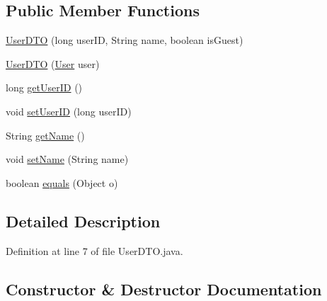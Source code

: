 \subsection*{Public Member Functions}
\begin{DoxyCompactItemize}
\item 
\mbox{\hyperlink{classes_1_1deusto_1_1server_1_1data_1_1_user_d_t_o_a00e605694b6157bcf7a1acc5e2adc735}{User\+D\+TO}} (long user\+ID, String name, boolean is\+Guest)
\item 
\mbox{\hyperlink{classes_1_1deusto_1_1server_1_1data_1_1_user_d_t_o_ab05044a5b24bdbdcc1bbe582b7268b71}{User\+D\+TO}} (\mbox{\hyperlink{classes_1_1deusto_1_1server_1_1jdo_1_1_user}{User}} user)
\item 
long \mbox{\hyperlink{classes_1_1deusto_1_1server_1_1data_1_1_user_d_t_o_ae04b78d874974f7f3307b68fa2a15210}{get\+User\+ID}} ()
\item 
void \mbox{\hyperlink{classes_1_1deusto_1_1server_1_1data_1_1_user_d_t_o_ad96e17b7c2a478f263f7a7b8bf7dde14}{set\+User\+ID}} (long user\+ID)
\item 
String \mbox{\hyperlink{classes_1_1deusto_1_1server_1_1data_1_1_user_d_t_o_a3e5416e48bbbd923f0d23b87f02e3aaf}{get\+Name}} ()
\item 
void \mbox{\hyperlink{classes_1_1deusto_1_1server_1_1data_1_1_user_d_t_o_a15f7773676e2cca068e63f604fb61ab0}{set\+Name}} (String name)
\item 
boolean \mbox{\hyperlink{classes_1_1deusto_1_1server_1_1data_1_1_user_d_t_o_a2963ea7c4e6ae150e958abc1f0ce2bbb}{equals}} (Object o)
\end{DoxyCompactItemize}


\subsection{Detailed Description}


Definition at line 7 of file User\+D\+T\+O.\+java.



\subsection{Constructor \& Destructor Documentation}
\mbox{\label{classes_1_1deusto_1_1server_1_1data_1_1_user_d_t_o_a00e605694b6157bcf7a1acc5e2adc735}} 
